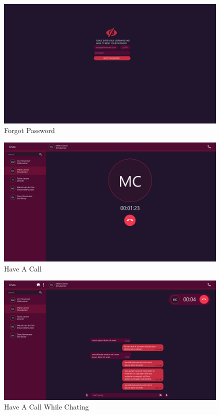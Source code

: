 \begin{figure}[h]
    \centering
    \includegraphics[width=1.0\textwidth]{./graphics/wireframes/ForgotPassword}
    \caption{Forgot Password}
    \label{fig:figure18}
\end{figure}

\begin{figure}[h]
    \centering
    \includegraphics[width=1.0\textwidth]{./graphics/wireframes/HaveACall}
    \caption{Have A Call}
    \label{fig:figure19}
\end{figure}

\begin{figure}[h]
    \centering
    \includegraphics[width=1.0\textwidth]{./graphics/wireframes/HaveACallWhileChating}
    \caption{Have A Call While Chating}
    \label{fig:figure20}
\end{figure}

